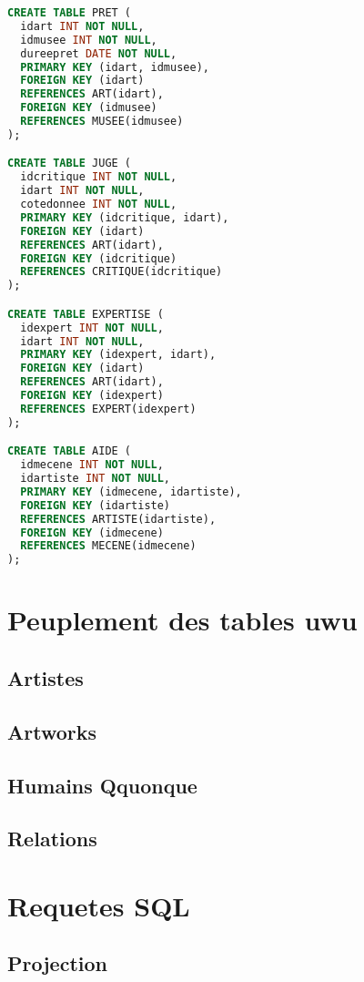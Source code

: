 \documentclass{article}
\begin{document}
\begin{multicols}{2}
\begin{lstlisting}[language=SQL]
CREATE TABLE PRET (
  idart INT NOT NULL,
  idmusee INT NOT NULL,
  dureepret DATE NOT NULL,
  PRIMARY KEY (idart, idmusee),
  FOREIGN KEY (idart)
  REFERENCES ART(idart),
  FOREIGN KEY (idmusee)
  REFERENCES MUSEE(idmusee)
);

CREATE TABLE JUGE (
  idcritique INT NOT NULL,
  idart INT NOT NULL,
  cotedonnee INT NOT NULL,
  PRIMARY KEY (idcritique, idart),
  FOREIGN KEY (idart)
  REFERENCES ART(idart),
  FOREIGN KEY (idcritique)
  REFERENCES CRITIQUE(idcritique)
);

CREATE TABLE EXPERTISE (
  idexpert INT NOT NULL,
  idart INT NOT NULL,
  PRIMARY KEY (idexpert, idart),
  FOREIGN KEY (idart)
  REFERENCES ART(idart),
  FOREIGN KEY (idexpert)
  REFERENCES EXPERT(idexpert)
);

CREATE TABLE AIDE (
  idmecene INT NOT NULL,
  idartiste INT NOT NULL,
  PRIMARY KEY (idmecene, idartiste),
  FOREIGN KEY (idartiste)
  REFERENCES ARTISTE(idartiste),
  FOREIGN KEY (idmecene)
  REFERENCES MECENE(idmecene)
);
\end{lstlisting}
\end{multicols}

\restoregeometry

\section{Peuplement des tables uwu}

\subsection{Artistes}
\subsection{Artworks}
\subsection{Humains Qquonque}
\subsection{Relations}


\section{Requetes SQL}

\subsection{Projection}
\end{document}
